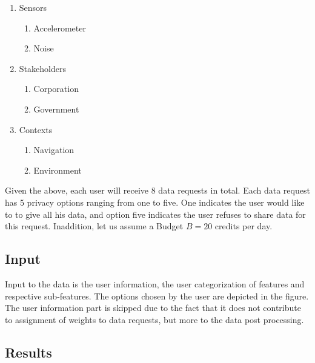 \begin{enumerate}
    \item Sensors
    \begin{enumerate}
    \item Accelerometer
    \item Noise
   \end{enumerate}
    \item Stakeholders
    \begin{enumerate}
    \item Corporation
    \item Government
   \end{enumerate}
   \item Contexts
    \begin{enumerate}
    \item Navigation
    \item Environment
   \end{enumerate}
 \end{enumerate}
 
Given the above, each user will receive 8 data requests in total. Each data request has 5 privacy options ranging from one to five. One indicates the user would like to to give all his data, and option five indicates the user refuses to share data for this request. Inaddition, let us
assume a Budget $B=20$ credits per day.
 
\subsection{Input} 
Input to the data is the user information, the user categorization of features and respective sub-features.
The options chosen by the user are depicted in the figure. The user information part is skipped due to the fact that it does not contribute
to assignment of weights to data requests, but more to the data post processing.

\subsection{Results}











